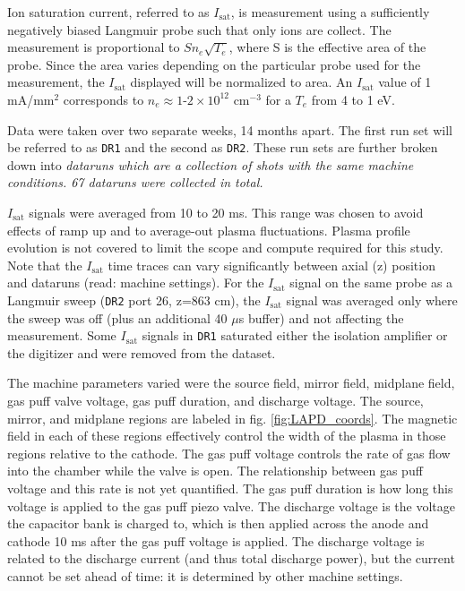 Ion saturation current, referred to as $I_\text{sat}$, is measurement using a sufficiently negatively biased Langmuir probe such that only ions are collect. The measurement is proportional to $S n_e \sqrt{T_e}$, where S is the effective area of the probe. Since the area varies depending on the particular probe used for the measurement, the $I_\text{sat}$ displayed will be normalized to area. An $I_\text{sat}$ value of 1 mA/mm$^2$ corresponds to $n_e \approx 1\text{-}2\times 10^{12}$ cm$^{-3}$ for a $T_e$ from 4 to 1 eV.

Data were taken over two separate weeks, 14 months apart. The first run set will be referred to as \texttt{DR1} and the second as \texttt{DR2}. These run sets are further broken down into \em dataruns \em which are a collection of shots with the same machine conditions. 67 dataruns were collected in total. 

$I_\text{sat}$ signals were averaged from 10 to 20 ms. This range was chosen to avoid effects of ramp up and to average-out plasma fluctuations. Plasma profile evolution is not covered to limit the scope and compute required for this study. 
Note that the $I_\text{sat}$ time traces can vary significantly between axial (z) position and dataruns (read: machine settings). For the $I_\text{sat}$ signal on the same probe as a Langmuir sweep (\texttt{DR2} port 26, z=863 cm), the $I_\text{sat}$ signal was averaged only where the sweep was off (plus an additional 40 $\mu$s buffer) and not affecting the measurement. Some $I_\text{sat}$ signals in \texttt{DR1} saturated either the isolation amplifier or the digitizer and were removed from the dataset.

The machine parameters varied were the source field, mirror field, midplane field, gas puff valve voltage, gas puff duration, and discharge voltage. The source, mirror, and midplane regions are labeled in fig. \ref{fig:LAPD_coords}. The magnetic field in each of these regions effectively control the width of the plasma in those regions relative to the cathode. The gas puff voltage controls the rate of gas flow into the chamber while the valve is open. The relationship between gas puff voltage and this rate is not yet quantified. The gas puff duration is how long this voltage is applied to the gas puff piezo valve. The discharge voltage is the voltage the capacitor bank is charged to, which is then applied across the anode and cathode 10 ms after the gas puff voltage is applied. The discharge voltage is related to the discharge current (and thus total discharge power), but the current cannot be set ahead of time: it is determined by other machine settings.

